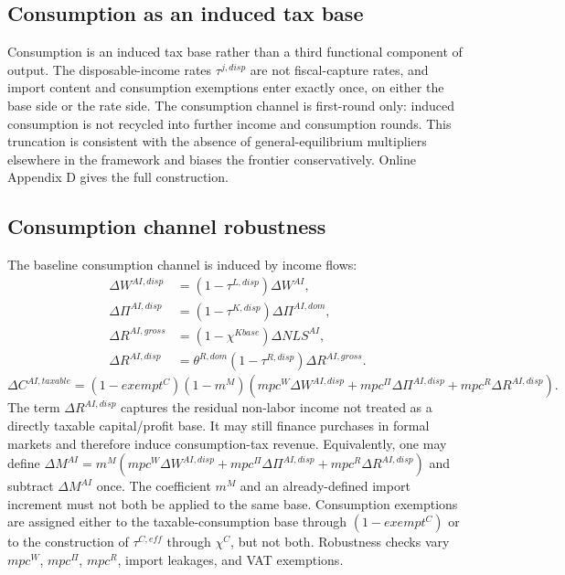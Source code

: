 \documentclass[11pt,a4paper]{article}
\begin{document}
\subsection{Consumption as an induced tax base}

Consumption is an induced tax base rather than a third functional component of output. The disposable-income rates $\tau^{j,disp}$ are not fiscal-capture rates, and import content and consumption exemptions enter exactly once, on either the base side or the rate side. The consumption channel is first-round only: induced consumption is not recycled into further income and consumption rounds. This truncation is consistent with the absence of general-equilibrium multipliers elsewhere in the framework and biases the frontier conservatively. Online Appendix D gives the full construction.

\subsection{Consumption channel robustness}

The baseline consumption channel is induced by income flows:
\begin{equation}
\begin{split}
    \Delta W^{AI,disp}&=(1-\tau^{L,disp})\Delta W^{AI},\\
    \Delta\Pi^{AI,disp}&=(1-\tau^{K,disp})\Delta\Pi^{AI,dom},\\
    \Delta R^{AI,gross}&=(1-\chi^{Kbase})\Delta NLS^{AI},\\
    \Delta R^{AI,disp}&=\theta^{R,dom}(1-\tau^{R,disp})\Delta R^{AI,gross}.
\end{split}
\end{equation}
\begin{equation}
    \Delta C^{AI,taxable}=(1-exempt^C)(1-m^M)\left(mpc^W\Delta W^{AI,disp}+mpc^\Pi\Delta\Pi^{AI,disp}+mpc^R\Delta R^{AI,disp}\right).
\end{equation}
The term $\Delta R^{AI,disp}$ captures the residual non-labor income not treated as a directly taxable capital/profit base. It may still finance purchases in formal markets and therefore induce consumption-tax revenue. Equivalently, one may define $\Delta M^{AI}=m^M(mpc^W\Delta W^{AI,disp}+mpc^\Pi\Delta\Pi^{AI,disp}+mpc^R\Delta R^{AI,disp})$ and subtract $\Delta M^{AI}$ once. The coefficient $m^M$ and an already-defined import increment must not both be applied to the same base. Consumption exemptions are assigned either to the taxable-consumption base through $(1-exempt^C)$ or to the construction of $\tau^{C,eff}$ through $\chi^C$, but not both. Robustness checks vary $mpc^W$, $mpc^\Pi$, $mpc^R$, import leakages, and VAT exemptions.
\end{document}
